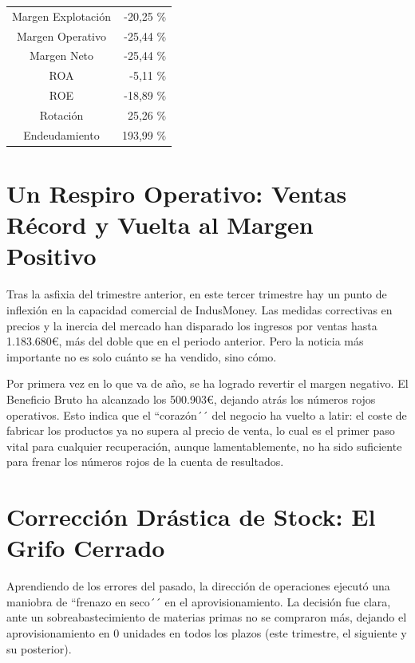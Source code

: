 \begin{table}[h]
    \centering
    \begin{tabular}{|c|r|}
        \hline
        Margen Explotación  & -20,25 \% \\
        Margen Operativo    & -25,44 \% \\
        Margen Neto         & -25,44 \% \\
        ROA                 & -5,11 \% \\
        ROE                 & -18,89 \% \\
        Rotación            & 25,26 \% \\
        Endeudamiento       & 193,99 \% \\
        \hline
    \end{tabular}
\end{table}

\section*{Un Respiro Operativo: Ventas Récord y Vuelta al Margen Positivo}
Tras la asfixia del trimestre anterior, en este tercer trimestre hay un punto de inflexión en la capacidad comercial de IndusMoney. Las medidas correctivas en precios y la inercia del mercado han disparado los ingresos por ventas hasta 1.183.680€, más del doble que en el periodo anterior. Pero la noticia más importante no es solo cuánto se ha vendido, sino cómo.

Por primera vez en lo que va de año, se ha logrado revertir el margen negativo. El Beneficio Bruto ha alcanzado los 500.903€, dejando atrás los números rojos operativos. Esto indica que el ``corazón´´ del negocio ha vuelto a latir: el coste de fabricar los productos ya no supera al precio de venta, lo cual es el primer paso vital para cualquier recuperación, aunque lamentablemente, no ha sido suficiente para frenar los números rojos de la cuenta de resultados.

\section*{Corrección Drástica de Stock: El Grifo Cerrado}
Aprendiendo de los errores del pasado, la dirección de operaciones ejecutó una maniobra de ``frenazo en seco´´ en el aprovisionamiento. La decisión fue clara, ante un sobreabastecimiento de materias primas no se compraron más, dejando el aprovisionamiento en 0 unidades en todos los plazos (este trimestre, el siguiente y su posterior).

